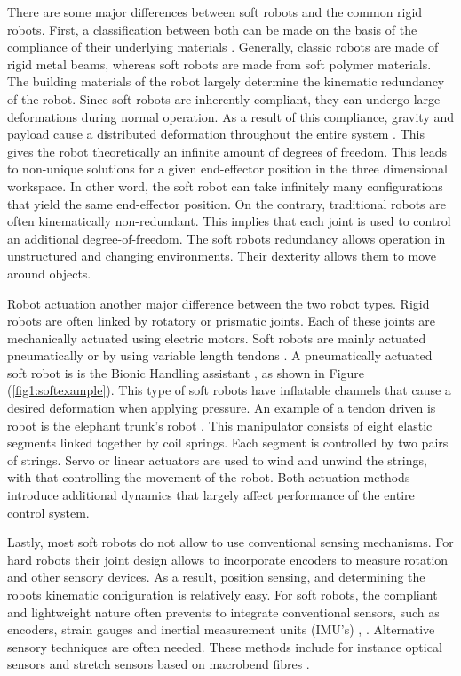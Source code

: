 There are some major differences between soft robots and the common rigid robots. First, a classification between both can be made on the basis of the compliance of their underlying materials \cite{Bionics2008}. Generally, classic robots are  made of rigid metal beams, whereas soft robots are made from soft polymer materials. 
The building materials of the robot largely determine the kinematic redundancy of the robot. Since soft robots are inherently compliant, they can undergo large deformations during normal operation. As a result of this compliance, gravity and payload cause a distributed deformation throughout the entire system . This gives the robot theoretically an infinite amount of degrees of freedom. This leads to non-unique solutions for a given end-effector position in the three dimensional workspace. In other word, the soft robot can take infinitely many configurations that yield the same end-effector position. On the contrary, traditional robots are often kinematically non-redundant. This implies that each joint is used to control an additional degree-of-freedom. The soft robots redundancy allows operation in unstructured and changing environments. Their dexterity allows them to move around objects.

Robot actuation another major difference between the two robot types. Rigid robots are often linked by rotatory or prismatic joints. Each of these joints are mechanically actuated using electric motors. Soft robots are mainly actuated pneumatically or by using variable length tendons \cite{Rus2015}. A pneumatically actuated soft robot is is the Bionic Handling assistant \cite{rolf2012constant}, as shown in Figure (\ref{fig1:softexample}). This type of soft robots have inflatable channels that cause a desired deformation when applying pressure. An example of a tendon driven is robot is the elephant trunk's robot \cite{cieslak1999elephant}. This manipulator consists of eight elastic segments linked together by coil springs. Each segment is controlled by two pairs of strings. Servo or linear actuators are used to wind and unwind the strings, with that controlling the movement of the robot. Both actuation methods introduce additional dynamics that largely affect performance of the entire control system. 

Lastly, most soft robots do not allow to use conventional sensing mechanisms. For hard robots their joint design allows to incorporate encoders to measure rotation and other sensory devices. As a result, position sensing, and determining the robots kinematic configuration is relatively easy. For soft robots, the compliant and lightweight nature often prevents to integrate conventional sensors, such as encoders, strain gauges and inertial measurement units (IMU's) \cite{Rus2015}, \cite{Lee2017}. Alternative sensory techniques are often needed. These methods include for instance optical sensors and stretch sensors based on macrobend fibres \cite{Sareh2015}.

